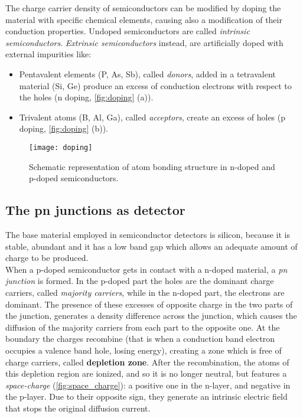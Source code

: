 The charge carrier density of semiconductors can be modified by doping the material with specific chemical elements, causing also a modification of their conduction properties.
Undoped semiconductors are called \emph{intrinsic semiconductors}. \emph{Extrinsic semiconductors} instead, are artificially doped with external impurities like: 

\begin{itemize}
\item Pentavalent elements (P, As, Sb), called \emph{donors}, added in a tetravalent material (Si, Ge) produce an excess of conduction electrons with respect to the holes (n doping, \autoref{fig:doping} (a)).
\item Trivalent atoms (B, Al, Ga), called \emph{acceptors}, create an excess of holes (p doping, \autoref{fig:doping} (b)).
\end{itemize}

\begin{figure}[h!]
\centering
\texttt{[image: doping]}
\caption{Schematic representation of atom bonding structure in n-doped and p-doped semiconductors.}
\label{fig:doping}
\end{figure}


\subsection{The pn junctions as detector}

The base material employed in semiconductor detectors is silicon, because it is stable, abundant and it has a low band gap which allows an adequate amount of charge to be produced.\\ 
When a p-doped semiconductor gets in contact with a n-doped material, a \textit{pn junction} is formed. In the p-doped part the holes are the dominant charge carriers, called \textit{majority carriers}, while in the n-doped part, the electrons are dominant. 
The presence of these excesses of opposite charge in the two parts of the junction, generates a density difference across the junction, which causes the diffusion of the majority carriers from each part to the opposite one. At the boundary the charges recombine (that is when a conduction band electron occupies a valence band hole, losing energy), creating a zone which is free of charge carriers, called \textbf{depletion zone}. After the recombination, the atoms of this depletion region are ionized, and so it is no longer neutral, but features a \emph{space-charge} (\autoref{fig:space_charge}): a positive one in the n-layer, and negative in the p-layer. Due to their opposite sign, they generate an intrinsic electric field that stops the original diffusion current.\\

